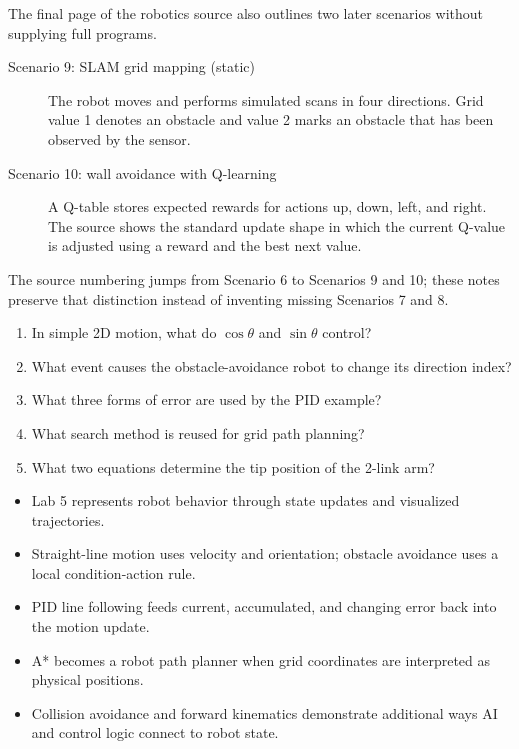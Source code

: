 The final page of the robotics source also outlines two later scenarios without supplying full programs.

\begin{description}
  \item[Scenario 9: SLAM grid mapping (static)] The robot moves and performs simulated scans in four directions. Grid value 1 denotes an obstacle and value 2 marks an obstacle that has been observed by the sensor.
  \item[Scenario 10: wall avoidance with Q-learning] A Q-table stores expected rewards for actions up, down, left, and right. The source shows the standard update shape in which the current Q-value is adjusted using a reward and the best next value.
\end{description}

The source numbering jumps from Scenario 6 to Scenarios 9 and 10; these notes preserve that distinction instead of inventing missing Scenarios 7 and 8.



\clearpage
\begin{quickcheck}
\begin{enumerate}
  \item In simple 2D motion, what do \(\cos\theta\) and \(\sin\theta\) control?
  \item What event causes the obstacle-avoidance robot to change its direction index?
  \item What three forms of error are used by the PID example?
  \item What search method is reused for grid path planning?
  \item What two equations determine the tip position of the 2-link arm?
\end{enumerate}
\end{quickcheck}

\begin{chapterrecap}
\begin{itemize}
  \item Lab 5 represents robot behavior through state updates and visualized trajectories.
  \item Straight-line motion uses velocity and orientation; obstacle avoidance uses a local condition-action rule.
  \item PID line following feeds current, accumulated, and changing error back into the motion update.
  \item A* becomes a robot path planner when grid coordinates are interpreted as physical positions.
  \item Collision avoidance and forward kinematics demonstrate additional ways AI and control logic connect to robot state.
\end{itemize}
\end{chapterrecap}
